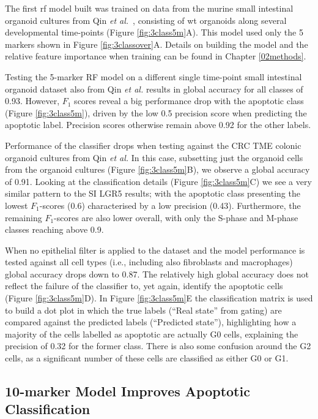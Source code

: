 The first \acrshort{rf} model built was trained on data from the murine small intestinal organoid cultures from Qin \emph{et al.}~\cite{qin_cell-type-specific_2020}, consisting of \acrshort{wt} organoids along several developmental time-points (Figure \ref{fig:3class5m}A). This model used only the 5 markers shown in Figure \ref{fig:3classover}A. Details on building the model and the relative feature importance when training can be found in Chapter \ref{02methods}.

Testing the 5-marker RF model on a different single time-point small intestinal organoid dataset also from Qin \emph{et al.} results in global accuracy for all classes of 0.93. However, $F_1$ scores reveal a big performance drop with the apoptotic class (Figure \ref{fig:3class5m}), driven by the low 0.5 precision score when predicting the apoptotic label. Precision scores otherwise remain above 0.92 for the other labels.

Performance of the classifier drops when testing against the CRC TME colonic organoid cultures from Qin \emph{et al.} In this case, subsetting just the organoid cells from the organoid cultures (Figure \ref{fig:3class5m}B), we observe a global accuracy of 0.91. Looking at the classification details (Figure \ref{fig:3class5m}C) we see a very similar pattern to the SI LGR5 results; with the apoptotic class presenting the lowest $F_1$-scores (0.6) characterised by a low precision (0.43). Furthermore, the remaining $F_1$-scores are also lower overall, with only the S-phase and M-phase classes reaching above 0.9.

When no epithelial filter is applied to the dataset and the model performance is tested against all cell types (i.e., including also fibroblasts and macrophages) global accuracy drops down to 0.87. The relatively high global accuracy does not reflect the failure of the classifier to, yet again, identify the apoptotic cells (Figure \ref{fig:3class5m}D). In Figure \ref{fig:3class5m}E the classification matrix is used to build a dot plot in which the true labels (“Real state” from gating) are compared against the predicted labels (“Predicted state”), highlighting how a majority of the cells labelled as apoptotic are actually G0 cells, explaining the precision of 0.32 for the former class. There is also some confusion around the G2 cells, as a significant number of these cells are classified as either G0 or G1.

\subsection{10-marker Model Improves Apoptotic Classification}

